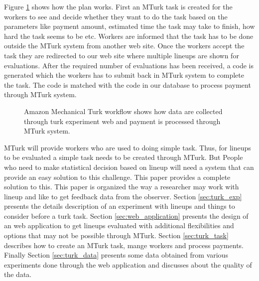 \documentclass[11pt]{article}
\begin{document}
Figure \ref{fig:turk_work_flow} shows how the plan works. First an MTurk task is created for the workers to see and decide whether they want to do the task based on the parameters like payment amount, estimated time the task may take to finish, how hard the task seems to be etc. Workers are informed that the task has to be done outside the MTurk system from another web site. Once the workers accept the task they are redirected to our web site where multiple lineups are shown for evaluations. After the required number of evaluations has been received, a code is generated which the workers has to submit back in MTurk system to complete the task. The code is matched with the code in our database to process payment through MTurk system.

\begin{figure}[htbp]
   \centering
       \caption{Amazon Mechanical Turk workflow shows how data are collected through turk experiment web and payment is processed through MTurk system.}
       \label{fig:turk_work_flow}
\end{figure}

MTurk will provide workers who are used to doing simple task. Thus, for lineups to be evaluated a simple task needs to be created through MTurk. But People who need to make statistical decision based on lineup will need a system that can provide an easy solution to this challenge.  This paper provides a complete solution to this. This paper is organized the way a researcher may work with lineup and like to get feedback data from the observer. Section \ref{sec:turk_exp} presents the details description of an experiment with lineups and things to consider before a turk task. Section \ref{sec:web_application} presents the design of an web application to get lineups evaluated with additional flexibilities and options that may not be possible through MTurk. Section \ref{sec:turk_task} describes how to create an MTurk task, mange workers and process payments. Finally Section \ref{sec:turk_data} presents some data obtained from various experiments done through the web application and discusses about the quality of the data.
\end{document}
